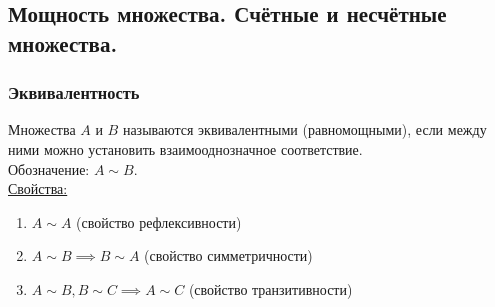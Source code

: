 \documentclass[12pt]{article}
\begin{document}
    \subsection{Мощность множества. Счётные и несчётные множества.}
    \subsubsection*{Эквивалентность}
    \noindent Множества $A$ и $B$ называются эквивалентными (равномощными), если между ними можно установить взаимооднозначное соответствие.\\
    Обозначение: $A \sim B$.\\
    \underline{Свойства:}
    \begin{enumerate}
        \item $A \sim A$ (свойство рефлексивности)
        \item $A \sim B \implies B \sim A$ (свойство симметричности)
        \item $A \sim B, B \sim C \implies A \sim C$ (свойство транзитивности)
    \end{enumerate}
\end{document}
